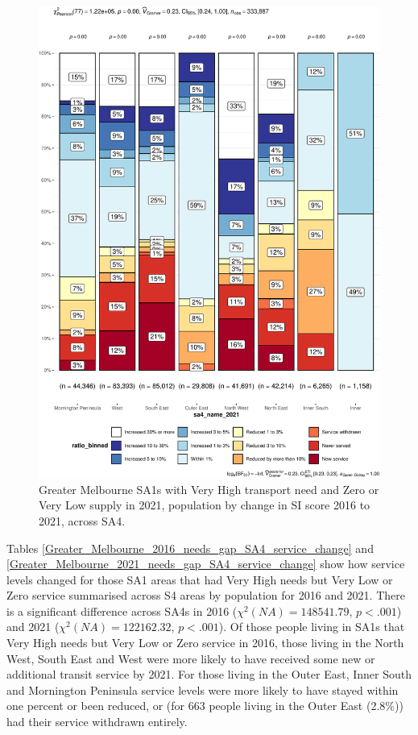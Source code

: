 \documentclass[preprint, 3p,
authoryear]{elsarticle} %
\begin{document}
\begin{figure}
\centering
\includegraphics{Leveraging_GTFS_to_assess_transit_supply_Transport_Geography_files/figure-latex/Greater_Melbourne_2021_needs_gap_SA4_service_change-1.pdf}
\caption{Greater Melbourne SA1s with Very High transport need and Zero
or Very Low supply in 2021, population by change in SI score 2016 to
2021, across SA4.}
\end{figure}

Tables \ref{Greater_Melbourne_2016_needs_gap_SA4_service_change} and
\ref{Greater_Melbourne_2021_needs_gap_SA4_service_change} show how
service levels changed for those SA1 areas that had Very High needs but
Very Low or Zero service summarised across S4 areas by population for
2016 and 2021. There is a significant difference across SA4s in 2016
(\(\chi^2(NA) = 148541.79\), \(p < .001\)) and 2021
(\(\chi^2(NA) = 122162.32\), \(p < .001\)). Of those people living in
SA1s that Very High needs but Very Low or Zero service in 2016, those
living in the North West, South East and West were more likely to have
received some new or additional transit service by 2021. For those
living in the Outer East, Inner South and Mornington Peninsula service
levels were more likely to have stayed within one percent or been
reduced, or (for 663 people living in the Outer East (2.8\%)) had their
service withdrawn entirely.
\end{document}
